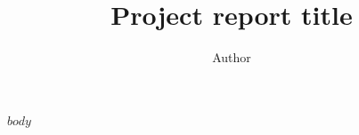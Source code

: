 \documentclass[12pt]{article}
\title{%
    Project report title}
\author{Author}
\begin{document}

\newpage
\tableofcontents
\newpage

\printglossaries

$body$


\end{document}
